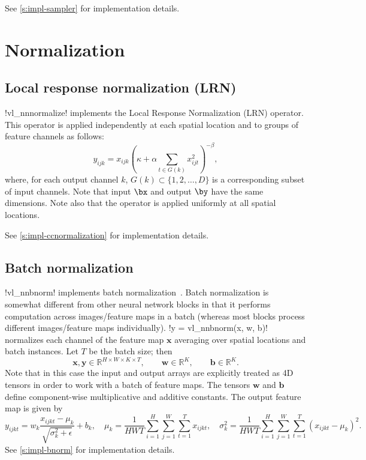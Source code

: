 See \cref{s:impl-sampler} for implementation details.

\section{Normalization}\label{s:normalization}

\subsection{Local response normalization (LRN)}\label{s:ccnormalization}

!vl_nnnormalize! implements the Local Response Normalization (LRN) operator. This operator is applied independently at each spatial location and to groups of feature channels as follows:
\[
 y_{ijk} = x_{ijk} \left( \kappa + \alpha \sum_{t\in G(k)} x_{ijt}^2 \right)^{-\beta},
\]
where, for each output channel $k$, $G(k) \subset \{1, 2, \dots, D\}$ is a corresponding subset of input channels. Note that input $\bx$ and output $\by$ have the same dimensions. Note also that the operator is applied uniformly at all spatial locations.

See \cref{s:impl-ccnormalization} for implementation details.

\subsection{Batch normalization}\label{s:bnorm}

!vl_nnbnorm! implements batch normalization~\cite{ioffe2015}. Batch normalization is somewhat different from other neural network blocks in that it performs computation across images/feature maps in a batch (whereas most blocks process different images/feature maps individually). !y = vl_nnbnorm(x, w, b)! normalizes each channel of the feature map $\mathbf{x}$ averaging over spatial locations and batch instances. Let $T$ be the batch size; then
\[
\mathbf{x}, \mathbf{y} \in \mathbb{R}^{H \times W \times K \times T},
\qquad\mathbf{w} \in \mathbb{R}^{K},
\qquad\mathbf{b} \in \mathbb{R}^{K}.
\]
Note that in this case the input and output arrays are explicitly treated as 4D tensors in order to work with a batch of feature maps. The tensors  $\mathbf{w}$ and $\mathbf{b}$ define component-wise multiplicative and additive constants. The output feature map is given by
\[
y_{ijkt} = w_k \frac{x_{ijkt} - \mu_{k}}{\sqrt{\sigma_k^2 + \epsilon}} + b_k,
\quad
\mu_{k} = \frac{1}{HWT}\sum_{i=1}^H \sum_{j=1}^W \sum_{t=1}^{T} x_{ijkt},
\quad
\sigma^2_{k} = \frac{1}{HWT}\sum_{i=1}^H \sum_{j=1}^W \sum_{t=1}^{T} (x_{ijkt} - \mu_{k})^2.
\]
See \cref{s:impl-bnorm} for implementation details.

